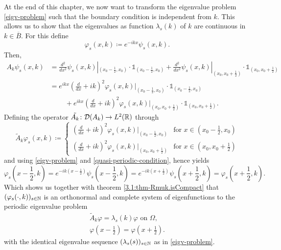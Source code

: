 At the end of this chapter, we now want to transform the eigenvalue problem \eqref{eigv-problem} such that the boundary condition is independent from $k$. This allows us to show that the eigenvalues as function $\lambda_{s}(k)$ of $k$ are continuous in $k \in \overline{B}$. For this define
	\[ \varphi_{s}(x, k) \coloneqq e^{-ikx} \psi_{s}(x, k). \]
Then,
	\begin{align*}
		A_{k} \psi_{s}(x, k) & = \frac{d^{2}}{dx^{2}} \psi_{s}(x, k)|_{(x_{0} - \frac{1}{2}, x_{0})} \cdot \mathds{1}_{(x_{0} - \frac{1}{2}, x_{0})} + \frac{d^{2}}{dx^{2}} \psi_{s}(x, k)|_{(x_{0}, x_{0}  + \frac{1}{2})} \cdot \mathds{1}_{(x_{0}, x_{0} + \frac{1}{2})} \\
				& = e^{ikx} \left( \frac{d}{dx} + ik \right)^{2} \varphi_{s}(x, k)|_{(x_{0} - \frac{1}{2}, x_{0})} \cdot \mathds{1}_{(x_{0} - \frac{1}{2}, x_{0})} \\
				& ~\qquad + e^{ikx} \left( \frac{d}{dx} + ik \right)^{2} \varphi_{s}(x, k)|_{(x_{0}, x_{0}  + \frac{1}{2})} \cdot \mathds{1}_{(x_{0}, x_{0} + \frac{1}{2})}.
	\end{align*}
Defining the operator $\tilde{A_{k}} \colon \mathcal{D}(A_{k}) \rightarrow L^{2}(\mathbb{R})$ through 
	\[ \tilde{A}_{k} \varphi_{s}(x, k) \coloneqq \begin{cases}
 		\left( \frac{d}{dx} + ik \right)^{2} \varphi_{s}(x, k)|_{(x_{0} - \frac{1}{2}, x_{0})} & \text{for } x \in (x_{0} - \frac{1}{2}, x_{0}) \\ \left( \frac{d}{dx} + ik \right)^{2} \varphi_{s}(x, k)|_{(x_{0}, x_{0}  + \frac{1}{2})} & \text{for } x \in (x_{0}, x_{0} + \frac{1}{2})
 	\end{cases} \] 
and using \eqref{eigv-problem} and \eqref{quasi-periodic-condition}, hence yields
		\[ \varphi_{s}\left(x - \frac{1}{2}, k\right) = e^{-ik(x - \frac{1}{2})} \psi_{s}\left(x - \frac{1}{2}, k\right) = e^{-ik(x + \frac{1}{2})} \psi_{s}\left(x + \frac{1}{2}, k\right) = \varphi_{s}\left(x + \frac{1}{2}, k\right). \]
Which shows us together with theorem \ref{3.1:thm-Rmuk.isCompact} that $(\varphi_{s}(\cdot, k))_{s \in \mathbb{N}}$ is an orthonormal and complete system of eigenfunctions to the periodic eigenvalue problem
	\begin{align}
		\tilde{A}_{k} \varphi = \lambda_{s}(k) \varphi \text{ on } \Omega, \label{mod-eigv-problem} \\
		 \varphi(x - \frac{1}{2}) = \varphi(x + \frac{1}{2}). \label{periodic-condition}
	\end{align}
with the identical eigenvalue sequence $(\lambda_{s}(s))_{s \in \mathbb{N}}$ as in \eqref{eigv-problem}. %